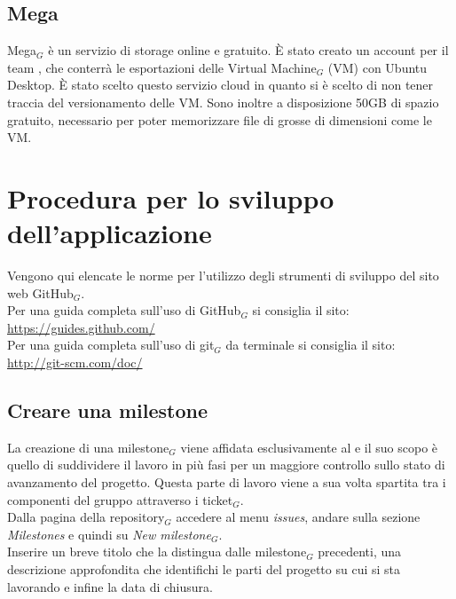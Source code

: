 \subsection{Mega}
Mega$_G$ è un servizio di storage online e gratuito. È stato creato un account per il team \gruppo, che conterrà le esportazioni delle Virtual Machine$_G$ (VM) con Ubuntu Desktop. È stato scelto questo servizio cloud in quanto si è scelto di non tener traccia del versionamento delle VM. Sono inoltre a disposizione 50GB di spazio gratuito, necessario per poter memorizzare file di grosse di dimensioni come le VM.

\newpage
\section{Procedura per lo sviluppo dell'applicazione}
Vengono qui elencate le norme per l'utilizzo degli strumenti di sviluppo del sito web GitHub$_G$. \\
Per una guida completa sull'uso di GitHub$_G$ si consiglia il sito: \\
\url{https://guides.github.com/}\\
Per una guida completa sull'uso di git$_G$ da terminale si consiglia il sito: \\
\url{http://git-scm.com/doc/}

\subsection{Creare una milestone}
La creazione di una milestone$_G$ viene affidata esclusivamente al \ruoloResponsabile{} e il suo scopo è quello di suddividere il lavoro in più fasi per un maggiore controllo sullo stato di avanzamento del progetto. Questa parte di lavoro viene a sua volta spartita tra i componenti del gruppo attraverso i ticket$_G$. \\
    Dalla pagina della repository$_G$ accedere al menu \textit{issues}, andare sulla sezione \textit{Milestones} e quindi su \textit{New milestone$_G$}.\\
    Inserire un breve titolo che la distingua dalle milestone$_G$ precedenti, una descrizione approfondita che identifichi le parti del progetto su cui si sta lavorando e infine la data di chiusura.

